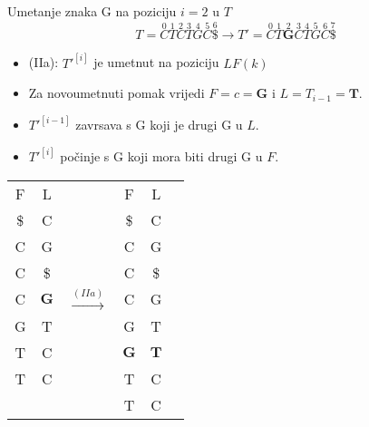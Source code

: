 \documentclass{ferseminar}
\begin{document}
\subparagraph{}
\begin{minipage}{0.5\textwidth}
\footnotesize
Umetanje znaka G na poziciju $i=2$ u $T$
$$
	T=\overset{0}{C}	\overset{1}{T} \overset{2}{C} \overset{3}{T}	\overset{4}{G}
	\overset{5}{C}	\overset{6}{\$} \rightarrow		
	T'=\overset{0}{C}	\overset{1}{T}	\overset{2}{\boldsymbol{G}}  \overset{3}{C} \overset{4}{T}	\overset{5}{G}
	\overset{6}{C}	\overset{7}{\$} 	
$$
\begin{itemize}
  \item[] (IIa): $T'^{[i]}$ je umetnut na poziciju $LF(k)$
  \item[] Za novoumetnuti pomak vrijedi $F=c=\boldsymbol{G}$ i $L=T_{i-1}=\boldsymbol{T}$.
  \item[] $T'^{[i-1]}$ zavrsava s G koji je drugi G u $L$.
  \item[] $T'^{[i]}$ počinje s G koji mora biti drugi G u $F$.
\end{itemize}

\end{minipage} \hfill
\begin{minipage}{0.45\textwidth}
\hspace{.2\textwidth}
\begin{tabular}{cccc|cc}
	\multicolumn{1}{c|}{F} & L & & F & L \\
	\cline{1-2}	\cline{4-5}
	\multicolumn{1}{c|}{\$} & C & & \$ & C \\
	\multicolumn{1}{c|}{C} & G & & C & G \\
	\multicolumn{1}{c|}{C} & \$ & & C & \$ \\
	
	\multicolumn{1}{c|}{C} & $\boldsymbol{G}$ & $\stackrel{(IIa)}{\longrightarrow}$ & C & G \\
	
	\multicolumn{1}{c|}{G} & T & & G & T \\
	\cline{4-5}
	\multicolumn{1}{c|}{T} & C & & \multicolumn{1}{|c|}{$\boldsymbol{G}$} & \multicolumn{1}{c|}{$\boldsymbol{T}$} \\
	\cline{4-5}
	\multicolumn{1}{c|}{T} & C & & T & C \\
	  &   & & T & C
\end{tabular}

\end{minipage}
\end{document}
